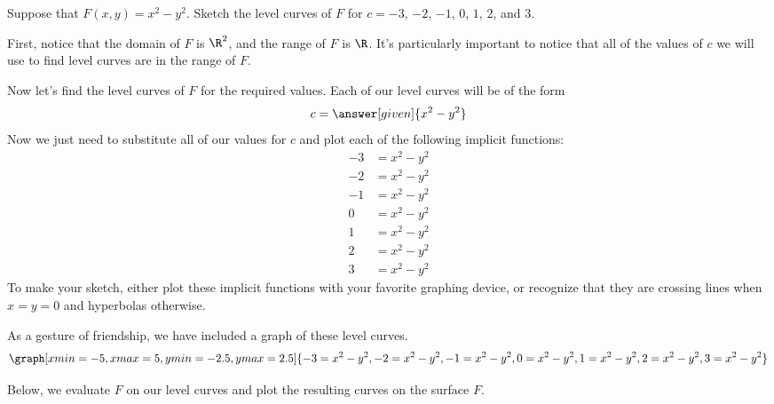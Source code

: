\documentclass{ximera}
\begin{document}
\begin{example}
  Suppose that $F(x,y) = x^2-y^2$. Sketch the level curves of $F$ for
  $c=-3$, $-2$, $-1$, $0$, $1$, $2$, and $3$.
  \begin{explanation}
    First, notice that the domain of $F$ is $\R^2$, and the range of $F$ is 
    $\R$.   It's particularly important to notice that all 
    of the values of $c$ we will use to find level curves are in the range 
    of $F$.
    
      Now let's find the level curves of $F$ for the required values.
      Each of our level curves will be of the form
      \[
      c = \answer[given]{x^2-y^2}
      \]
      Now we just need to substitute all of our values for $c$ and
      plot each of the following implicit functions:
    \begin{align*}
      -3 &= x^2-y^2\\
      -2 &= x^2-y^2\\
      -1 &= x^2-y^2\\
       0 &= x^2-y^2\\
       1 &= x^2-y^2\\
       2 &= x^2-y^2\\
       3 &= x^2-y^2
    \end{align*}
     To make your sketch, either plot these implicit functions with your favorite
    graphing device, or recognize that they are crossing lines when
    $x=y=0$ and hyperbolas otherwise.
    \begin{onlineOnly}
      As a gesture of friendship, we have included a graph of these
      level curves.
      \[
      \graph[xmin=-5, xmax=5, ymin=-2.5, ymax=2.5]{-3=x^2-y^2,-2=x^2-y^2,-1=x^2-y^2,0=x^2-y^2,1=x^2-y^2,2=x^2-y^2,3=x^2-y^2}
      \]
    \end{onlineOnly}
    Below, we evaluate $F$ on our level curves and plot the resulting 
    curves on the surface $F$.
    \begin{image}
\end{image}
\end{explanation}
\end{example}
\end{document}
